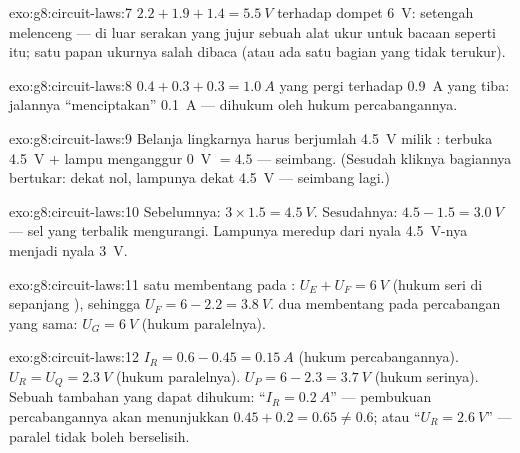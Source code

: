 \begin{solution}{exo:g8:circuit-laws:7}
$2.2 + 1.9 + 1.4 = \qty{5.5}{V}$ terhadap dompet \qty{6}{V}: setengah
 melenceng --- di luar serakan yang jujur sebuah alat ukur untuk
bacaan seperti itu; satu papan ukurnya salah dibaca (atau ada satu
bagian yang tidak terukur).
\end{solution}

\begin{solution}{exo:g8:circuit-laws:8}
$0.4 + 0.3 + 0.3 = \qty{1.0}{A}$ yang pergi terhadap \qty{0.9}{A}
yang tiba:  jalannya ``menciptakan'' \qty{0.1}{A} --- dihukum
oleh hukum percabangannya.
\end{solution}

\begin{solution}{exo:g8:circuit-laws:9}
Belanja lingkarnya harus berjumlah \qty{4.5}{V} milik :
 terbuka \qty{4.5}{V} $+$ lampu menganggur \qty{0}{V} $= 4.5$
--- seimbang. (Sesudah  kliknya bagiannya bertukar: 
dekat nol, lampunya dekat \qty{4.5}{V} --- seimbang lagi.)
\end{solution}

\begin{solution}{exo:g8:circuit-laws:10}
Sebelumnya: $3 \times 1.5 = \qty{4.5}{V}$. Sesudahnya: $4.5 - 1.5 =
\qty{3.0}{V}$ --- sel yang terbalik mengurangi. Lampunya meredup dari
nyala \qty{4.5}{V}-nya menjadi nyala \qty{3}{V}.
\end{solution}

\begin{solution}{exo:g8:circuit-laws:11}
 satu membentang pada : $U_E + U_F = \qty{6}{V}$
(hukum  seri di sepanjang ), sehingga $U_F = 6 - 2.2 =
\qty{3.8}{V}$.  dua membentang pada percabangan yang sama: $U_G =
\qty{6}{V}$ (hukum  paralelnya).
\end{solution}

\begin{solution}{exo:g8:circuit-laws:12}
$I_R = 0.6 - 0.45 = \qty{0.15}{A}$ (hukum percabangannya). $U_R = U_Q
= \qty{2.3}{V}$ (hukum  paralelnya). $U_P = 6 - 2.3 =
\qty{3.7}{V}$ (hukum  serinya). Sebuah tambahan yang dapat
dihukum: ``$I_R = \qty{0.2}{A}$'' --- pembukuan percabangannya akan
menunjukkan $0.45 + 0.2 = 0.65 \neq 0.6$; atau ``$U_R = \qty{2.6}{V}$''
---  paralel tidak boleh berselisih.
\end{solution}

